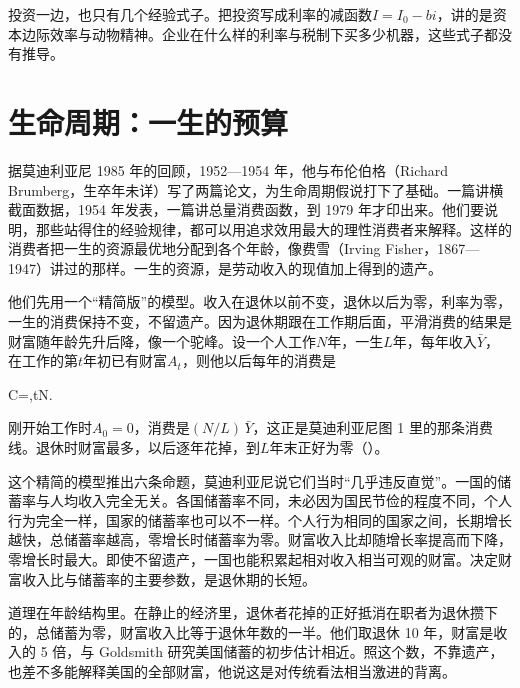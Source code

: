 投资一边，也只有几个经验式子。把投资写成利率的减函数$I=I_0-bi$，讲的是资本边际效率与动物精神。企业在什么样的利率与税制下买多少机器，这些式子都没有推导。

\section{生命周期：一生的预算}\label{sec:consumption-lifecycle}

据莫迪利亚尼 1985 年的回顾，1952—1954 年，他与布伦伯格（Richard Brumberg，生卒年未详）写了两篇论文，为生命周期假说打下了基础\cite{modigliani1985}。一篇讲横截面数据，1954 年发表，一篇讲总量消费函数，到 1979 年才印出来\cite{modigliani1985}。他们要说明，那些站得住的经验规律，都可以用追求效用最大的理性消费者来解释\cite{modigliani1985}。这样的消费者把一生的资源最优地分配到各个年龄，像费雪（Irving Fisher，1867—1947）讲过的那样\cite{modigliani1985,loc39}。一生的资源，是劳动收入的现值加上得到的遗产\cite{modigliani1985}。

他们先用一个“精简版”的模型\cite{modigliani1985}。收入在退休以前不变，退休以后为零，利率为零，一生的消费保持不变，不留遗产\cite{modigliani1985}。因为退休期跟在工作期后面，平滑消费的结果是财富随年龄先升后降，像一个驼峰\cite{modigliani1985}。设一个人工作$N$年，一生$L$年，每年收入$\bar Y$，在工作的第$t$年初已有财富$A_t$，则他以后每年的消费是
\begin{keyeq}
C=,\le t\le N.\label{eq:consumption-lifecycle}
\end{keyeq}
刚开始工作时$A_0=0$，消费是$(N/L)\,\bar Y$，这正是莫迪利亚尼图 1 里的那条消费线\cite{modigliani1985}。退休时财富最多，以后逐年花掉，到$L$年末正好为零（）。

这个精简的模型推出六条命题，莫迪利亚尼说它们当时“几乎违反直觉”\cite{modigliani1985}。一国的储蓄率与人均收入完全无关\cite{modigliani1985}。各国储蓄率不同，未必因为国民节俭的程度不同，个人行为完全一样，国家的储蓄率也可以不一样\cite{modigliani1985}。个人行为相同的国家之间，长期增长越快，总储蓄率越高，零增长时储蓄率为零\cite{modigliani1985}。财富收入比却随增长率提高而下降，零增长时最大\cite{modigliani1985}。即使不留遗产，一国也能积累起相对收入相当可观的财富\cite{modigliani1985}。决定财富收入比与储蓄率的主要参数，是退休期的长短\cite{modigliani1985}。

道理在年龄结构里。在静止的经济里，退休者花掉的正好抵消在职者为退休攒下的，总储蓄为零，财富收入比等于退休年数的一半\cite{modigliani1985}。他们取退休 10 年，财富是收入的 5 倍，与 Goldsmith 研究美国储蓄的初步估计相近\cite{modigliani1985}。照这个数，不靠遗产，也差不多能解释美国的全部财富，他说这是对传统看法相当激进的背离\cite{modigliani1985}。

